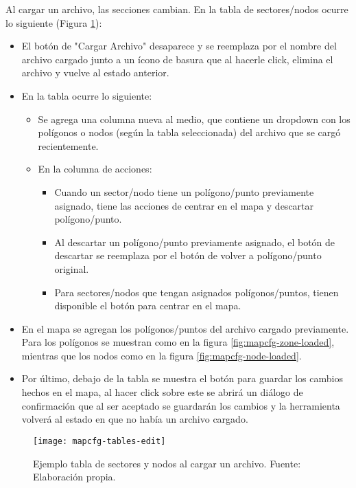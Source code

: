 Al cargar un archivo, las secciones cambian. En la tabla de sectores/nodos ocurre lo siguiente (Figura \ref{fig:mapcfg-tables-edit-exameple}):

\begin{itemize}
    \item El botón de "Cargar Archivo" desaparece y se reemplaza por el nombre del archivo cargado junto a un ícono de basura que al hacerle click, elimina el archivo y vuelve al estado anterior.
    \item En la tabla ocurre lo siguiente:
    \begin{itemize}
        \item Se agrega una columna nueva al medio, que contiene un dropdown con los polígonos o nodos (según la tabla seleccionada) del archivo que se cargó recientemente.
        \item En la columna de acciones:
        \begin{itemize}        
            \item Cuando un sector/nodo tiene un polígono/punto previamente asignado, tiene las acciones de centrar en el mapa y descartar polígono/punto.
            \item Al descartar un polígono/punto previamente asignado, el botón de descartar se reemplaza por el botón de volver a polígono/punto original.
            \item Para sectores/nodos que tengan asignados polígonos/puntos, tienen disponible el botón para centrar en el mapa.
        \end{itemize}
    \end{itemize}
    \item En el mapa se agregan los polígonos/puntos del archivo cargado previamente. Para los polígonos se muestran como en la figura \ref{fig:mapcfg-zone-loaded}, mientras que los nodos como en la figura \ref{fig:mapcfg-node-loaded}.
    \item Por último, debajo de la tabla se muestra el botón para guardar los cambios hechos en el mapa, al hacer click sobre este se abrirá un diálogo de confirmación que al ser aceptado se guardarán los cambios y la herramienta volverá al estado en que no había un archivo cargado.
\end{itemize}

\begin{figure}[H]
	\centering
	\texttt{[image: mapcfg-tables-edit]}
	\caption{\label{fig:mapcfg-tables-edit-exameple} Ejemplo tabla de sectores y nodos al cargar un archivo. Fuente: Elaboración propia.}
\end{figure}

